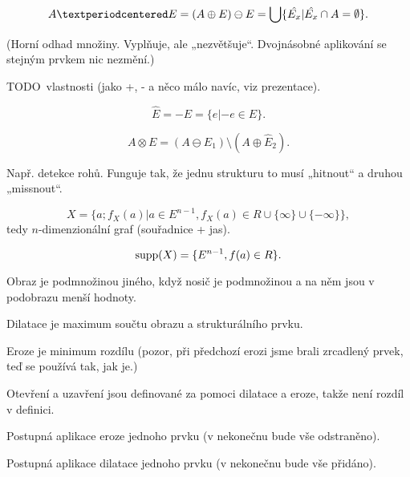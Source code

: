 \documentclass[12pt]{article}					%
\begin{document}
\begin{definice}[Uzavření]
	$$ A · E = (A \oplus E) \ominus E = \bigcup\{\hat{E_x} | \hat{E_x} \cap A = \O\}. $$

	(Horní odhad množiny. Vyplňuje, ale „nezvětšuje“. Dvojnásobné aplikování se stejným prvkem nic nezmění.)
\end{definice}

TODO vlastnosti (jako +, - a něco málo navíc, viz prezentace).

\begin{definice}[Zrcadlení]
	$$ \hat{E} = -E = \{e | -e \in E\}. $$
\end{definice}

\begin{definice}
	$$ A \otimes E = (A \ominus E_1) \setminus (A \oplus \hat{E}_2). $$

	Např. detekce rohů. Funguje tak, že jednu strukturu to musí „hitnout“ a druhou „missnout“.
\end{definice}

\begin{definice}
	$$ X = \{a; f_X(a) | a \in E^{n-1}, f_X(a) \in R \cup \{∞\} \cup \{-∞\}\}, $$
	tedy $n$-dimenzionální graf (souřadnice + jas).

	$$ \operatorname{supp}(X) = \{E^{n-1}, f(a) \in R\}. $$

	Obraz je podmnožinou jiného, když nosič je podmnožinou a na něm jsou v podobrazu menší hodnoty.
\end{definice}

\begin{definice}
	Dilatace je maximum součtu obrazu a strukturálního prvku.

	Eroze je minimum rozdílu (pozor, při předchozí erozi jsme brali zrcadlený prvek, teď se používá tak, jak je.)

	Otevření a uzavření jsou definované za pomoci dilatace a eroze, takže není rozdíl v definici.
\end{definice}


\begin{definice}
	Postupná aplikace eroze jednoho prvku (v nekonečnu bude vše odstraněno).
\end{definice}

\begin{definice}
	Postupná aplikace dilatace jednoho prvku (v nekonečnu bude vše přidáno).
\end{definice}
\end{document}
